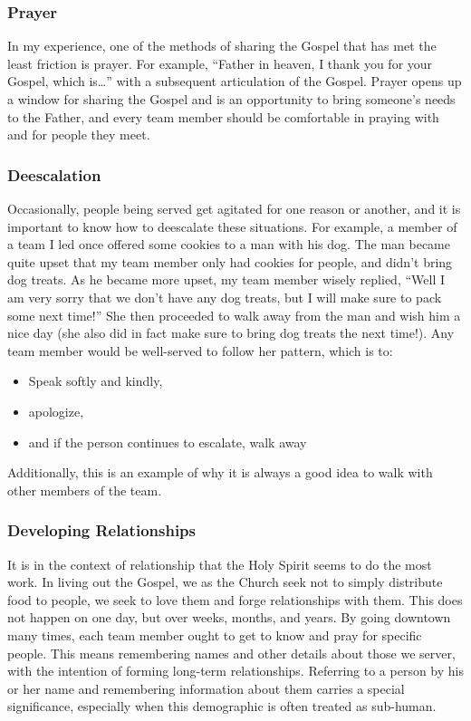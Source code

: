 \documentclass[12pt]{article}
\begin{document}
\subsubsection{Prayer}

    In my experience, one of the methods of sharing the Gospel that has met the least friction is prayer.
    For example, ``Father in heaven, I thank you for your Gospel, which is\dots'' with a subsequent articulation of the Gospel.
    Prayer opens up a window for sharing the Gospel and is an opportunity to bring someone's needs to the Father, and every team member should be comfortable in praying with and for people they meet.

\subsubsection{Deescalation}

    Occasionally, people being served get agitated for one reason or another, and it is important to know how to deescalate these situations.
    For example, a member of a team I led once offered some cookies to a man with his dog.
    The man became quite upset that my team member only had cookies for people, and didn't bring dog treats.
    As he became more upset, my team member wisely replied, ``Well I am very sorry that we don't have any dog treats, but I will make sure to pack some next time!''
    She then proceeded to walk away from the man and wish him a nice day (she also did in fact make sure to bring dog treats the next time!).
    Any team member would be well-served to follow her pattern, which is to:
    \begin{itemize}
        \item Speak softly and kindly,
        \item apologize,
        \item and if the person continues to escalate, walk away
    \end{itemize}
    Additionally, this is an example of why it is always a good idea to walk with other members of the team.

\subsubsection{Developing Relationships}

    \qPiperCoronary
    It is in the context of relationship that the Holy Spirit seems to do the most work.
    In living out the Gospel, we as the Church seek not to simply distribute food to people, we seek to love them and forge relationships with them.
    This does not happen on one day, but over weeks, months, and years.
    By going downtown many times, each team member ought to get to know and pray for specific people.
    This means remembering names and other details about those we server, with the intention of forming long-term relationships.
    Referring to a person by his or her name and remembering information about them carries a special significance, especially when this demographic is often treated as sub-human.
\end{document}
